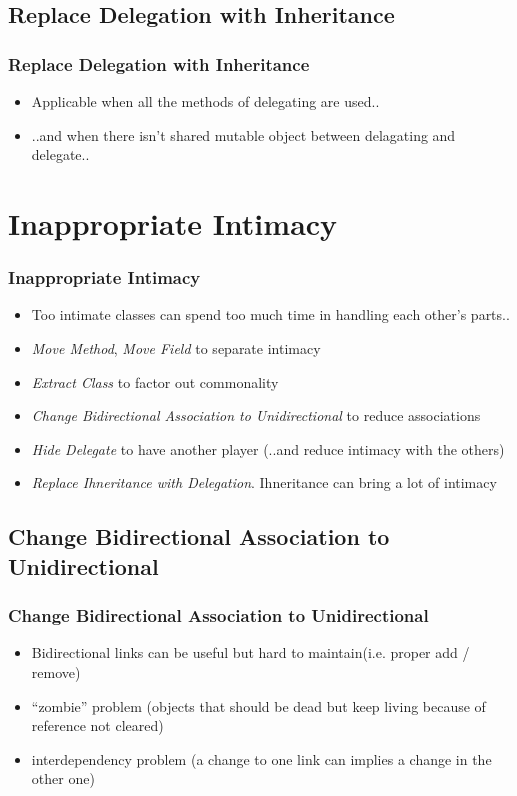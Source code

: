 \documentclass{beamer}
\begin{document}
\subsection{Replace Delegation with Inheritance}
\begin{frame}
  \frametitle{Replace Delegation with Inheritance}
  \begin{itemize}
	\item<+-> Applicable when all the methods of delegating are used..
	\item<+-> ..and when there isn't shared mutable object between delagating and delegate..
   \end{itemize}
\end{frame}

\section{Inappropriate Intimacy}
\begin{frame}
  \frametitle{Inappropriate Intimacy}
  \begin{itemize}
	\item<+-> Too intimate classes can spend too much time in handling each other's parts..
	\item<+-> \textit{Move Method}, \textit{Move Field} to separate intimacy
	\item<+-> \textit{Extract Class} to factor out commonality
	\item<+-> \textit{Change Bidirectional Association to Unidirectional} to reduce associations
	\item<+-> \textit{Hide Delegate} to have another player (..and reduce intimacy with the others)
	\item<+-> \textit{Replace Ihneritance with Delegation}. Ihneritance can bring a lot of intimacy 
   \end{itemize}
\end{frame}

\subsection{Change Bidirectional Association to Unidirectional}
\begin{frame}
  \frametitle{Change Bidirectional Association to Unidirectional}
  \begin{itemize}
	\item<+-> Bidirectional links can be useful but hard to maintain(i.e. proper add / remove)
	\item<+-> ``zombie'' problem (objects that should be dead but keep living because of reference not cleared)
	\item<+-> interdependency problem (a change to one link can implies a change in the other one) 
   \end{itemize}
\end{frame}
\end{document}
